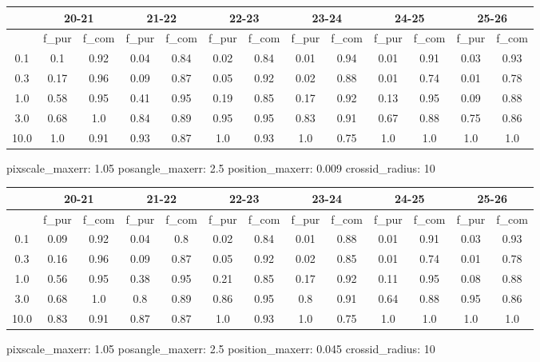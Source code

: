 \documentclass{article}
\begin{document}
\begin{figure}[H]
\centering
\begin{tabular}{|c|c|c|c|c|c|c|c|c|c|c|c|c|}
\hline
\multicolumn{1}{|c|}{} & \multicolumn{2}{|c|}{20-21} & \multicolumn{2}{|c|}{21-22} & \multicolumn{2}{|c|}{22-23} & \multicolumn{2}{|c|}{23-24} & \multicolumn{2}{|c|}{24-25} & \multicolumn{2}{|c|}{25-26}\\
\hline \hline
 & f\_pur & f\_com & f\_pur & f\_com & f\_pur & f\_com & f\_pur & f\_com & f\_pur & f\_com & f\_pur & f\_com \\
\hline
0.1 & 0.1 & 0.92 & 0.04 & 0.84 & 0.02 & 0.84 & 0.01 & 0.94 & 0.01 & 0.91 & 0.03 & 0.93\\
\hline
0.3 & 0.17 & 0.96 & 0.09 & 0.87 & 0.05 & 0.92 & 0.02 & 0.88 & 0.01 & 0.74 & 0.01 & 0.78\\
\hline
1.0 & 0.58 & 0.95 & 0.41 & 0.95 & 0.19 & 0.85 & 0.17 & 0.92 & 0.13 & 0.95 & 0.09 & 0.88\\
\hline
3.0 & 0.68 & 1.0 & 0.84 & 0.89 & 0.95 & 0.95 & 0.83 & 0.91 & 0.67 & 0.88 & 0.75 & 0.86\\
\hline
10.0 & 1.0 & 0.91 & 0.93 & 0.87 & 1.0 & 0.93 & 1.0 & 0.75 & 1.0 & 1.0 & 1.0 & 1.0\\
\hline
\end{tabular}
\caption{pixscale\_maxerr: 1.05 posangle\_maxerr: 2.5 position\_maxerr: 0.009 crossid\_radius: 10}
\end{figure}

\begin{figure}[H]
\centering
\begin{tabular}{|c|c|c|c|c|c|c|c|c|c|c|c|c|}
\hline
\multicolumn{1}{|c|}{} & \multicolumn{2}{|c|}{20-21} & \multicolumn{2}{|c|}{21-22} & \multicolumn{2}{|c|}{22-23} & \multicolumn{2}{|c|}{23-24} & \multicolumn{2}{|c|}{24-25} & \multicolumn{2}{|c|}{25-26}\\
\hline \hline
 & f\_pur & f\_com & f\_pur & f\_com & f\_pur & f\_com & f\_pur & f\_com & f\_pur & f\_com & f\_pur & f\_com \\
\hline
0.1 & 0.09 & 0.92 & 0.04 & 0.8 & 0.02 & 0.84 & 0.01 & 0.88 & 0.01 & 0.91 & 0.03 & 0.93\\
\hline
0.3 & 0.16 & 0.96 & 0.09 & 0.87 & 0.05 & 0.92 & 0.02 & 0.85 & 0.01 & 0.74 & 0.01 & 0.78\\
\hline
1.0 & 0.56 & 0.95 & 0.38 & 0.95 & 0.21 & 0.85 & 0.17 & 0.92 & 0.11 & 0.95 & 0.08 & 0.88\\
\hline
3.0 & 0.68 & 1.0 & 0.8 & 0.89 & 0.86 & 0.95 & 0.8 & 0.91 & 0.64 & 0.88 & 0.95 & 0.86\\
\hline
10.0 & 0.83 & 0.91 & 0.87 & 0.87 & 1.0 & 0.93 & 1.0 & 0.75 & 1.0 & 1.0 & 1.0 & 1.0\\
\hline
\end{tabular}
\caption{pixscale\_maxerr: 1.05 posangle\_maxerr: 2.5 position\_maxerr: 0.045 crossid\_radius: 10}
\end{figure}
\end{document}

